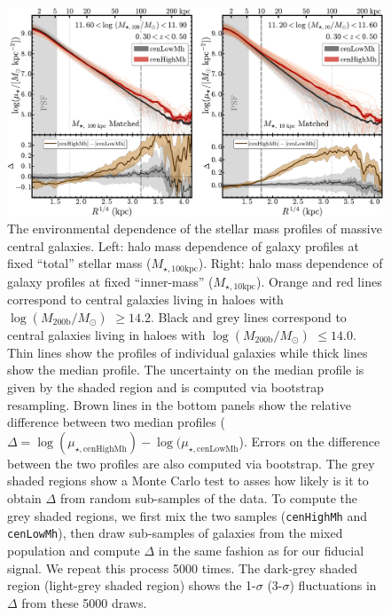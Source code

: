 \documentclass[a4paper,fleqn,usenatbib]{mnras}
\def\rbcg{\texttt{cenHighMh}}
\def\nbcg{\texttt{cenLowMh}}
\def\logmh{{$\log (M_{\mathrm{200b}}/M_{\odot})$}}
\def\minn{{$M_{\star,10\mathrm{kpc}}$}}
\def\mtot{{$M_{\star,100\mathrm{kpc}}$}}
\begin{document}
  \begin{figure}
      \centering 
      \includegraphics[width=\textwidth]{fig/redbcg_prof_1}
      \caption{
          The environmental dependence of the stellar mass profiles of massive central 
          galaxies. 
          Left: halo mass dependence of galaxy profiles at fixed ``total'' stellar mass 
          (\mtot{}). 
          Right: halo mass dependence of galaxy profiles at fixed ``inner-mass'' 
          (\minn{}). Orange and red lines correspond to central galaxies living in 
          haloes with \logmh{} $\geq 14.2$. 
          Black and grey lines correspond to central galaxies living in haloes with 
          \logmh{} $\leq 14.0$. 
          Thin lines show the profiles of individual galaxies while thick lines show 
          the median profile. 
          The uncertainty on the median profile is given by the shaded region and is 
          computed via bootstrap resampling. 
          Brown lines in the bottom panels show the relative difference between  
          two median profiles 
          ($\Delta = \log(\mu_{\star, \mathrm{cenHighMh}}) - 
          \log(\mu_{\star, \mathrm{cenLowMh}}$). 
          Errors on the difference between the two profiles are also computed 
          via bootstrap.
          The grey shaded regions show a Monte Carlo test to asses how likely is it to 
          obtain $\Delta$ from random sub-samples of the data. 
          To compute the grey shaded regions, we first mix the two samples 
          (\rbcg{} and \nbcg{}), then draw sub-samples of galaxies from the mixed 
          population and compute $\Delta$ in the same fashion as for our fiducial 
          signal. 
          We repeat this process 5000 times.  
          The dark-grey shaded region (light-grey shaded region) shows the 1-$\sigma$ 
          (3-$\sigma$) fluctuations in $\Delta$ from these 5000 draws.
          }
      \label{fig:prof_1} 
  \end{figure}
\end{document}
